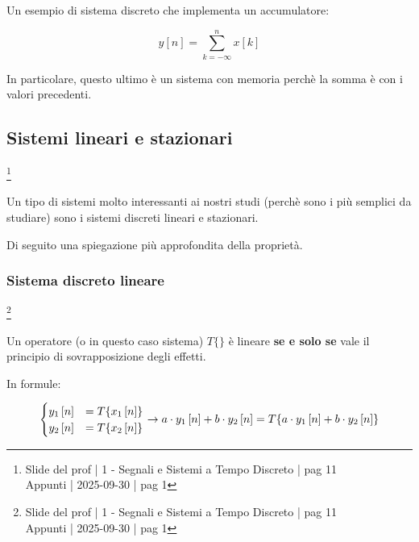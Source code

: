 Un esempio di sistema discreto che implementa un accumulatore: 

{
    \Large 
    \begin{equation}
        y \left[ n \right]
        = 
        \sum_{k = - \infty}^{n} x \left[ k \right]
    \end{equation}
}

In particolare, 
questo ultimo è un sistema con memoria perchè la somma è con i valori precedenti. \newline 

\newpage 

\subsection{Sistemi lineari e stazionari}

\footnote{ 
    Slide del prof | 1 - Segnali e Sistemi a Tempo Discreto | pag 11\\
    Appunti | 2025-09-30 | pag 1
}

Un tipo di sistemi molto interessanti ai nostri studi (perchè sono i più semplici da studiare) 
sono i sistemi discreti lineari e stazionari. \newline 

Di seguito una spiegazione più approfondita della proprietà. \newline 

\newpage 

\subsubsection{Sistema discreto lineare}

\footnote{ 
    Slide del prof | 1 - Segnali e Sistemi a Tempo Discreto | pag 11\\
    Appunti | 2025-09-30 | pag 1
}

Un operatore (o in questo caso sistema) $T \{ \}$ è lineare \textbf{se e solo se} vale il principio di sovrapposizione degli effetti. \newline 

In formule: 

{
    \Large 
    \begin{equation}
        \setlength{\jot}{10pt} %
        \begin{cases}
        y_1 \left[ n \right]
        &= 
        T \{ x_1 \left[ n\right]\}
        \\
        y_2 \left[ n \right]
        &= 
        T \{ x_2 \left[ n\right]\}
        \end{cases}        
        \to 
        a \cdot y_1 \left[ n\right]
        + 
        b \cdot y_2 \left[ n\right]
        = 
        T 
        \{ 
        a \cdot y_1 \left[ n\right]
        + 
        b \cdot y_2 \left[ n\right]
        \}
    \end{equation}
}

